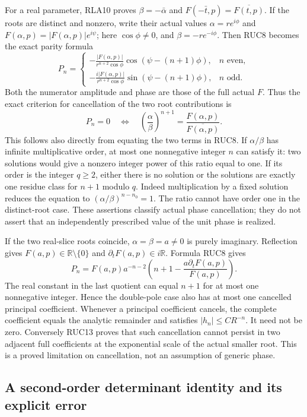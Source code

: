 For a real parameter, RLA10 proves
$\beta=-\bar\alpha$ and $F(-\bar t,p)=\overline{F(t,p)}$.
If the roots are distinct and nonzero, write their actual values
$\alpha=r e^{i\phi}$ and $F(\alpha,p)=|F(\alpha,p)|e^{i\psi}$;
here $\cos\phi\ne0$, and $\beta=-r e^{-i\phi}$.
Then RUC8 becomes the exact parity formula
\[
 P_n=\begin{cases}
 \displaystyle-\frac{|F(\alpha,p)|}{r^{n+2}\cos\phi}
          \cos(\psi-(n+1)\phi),&n\text{ even},\\[5pt]
 \displaystyle-\frac{i|F(\alpha,p)|}{r^{n+2}\cos\phi}
          \sin(\psi-(n+1)\phi),&n\text{ odd}.
 \end{cases}\tag{RUC14}
\]
Both the numerator amplitude and phase are those of the full
actual $F$.  Thus the exact criterion for cancellation of the
two root contributions is
\[
 P_n=0\quad\Longleftrightarrow\quad
 \left(\frac\alpha\beta\right)^{n+1}
       =\frac{F(\alpha,p)}{\overline{F(\alpha,p)}}.
 \tag{RUC15}
\]
This follows also directly from equating the two terms in RUC8.
If $\alpha/\beta$ has infinite multiplicative order, at most one
nonnegative integer $n$ can satisfy it: two solutions would give
a nonzero integer power of this ratio equal to one.  If its order
is the integer $q\ge2$, either there is no solution or the
solutions are exactly one residue class for $n+1$ modulo $q$.
Indeed multiplication by a fixed solution reduces the equation
to $(\alpha/\beta)^{n-n_0}=1$.  The ratio cannot have order one
in the distinct-root case.  These assertions classify actual
phase cancellation; they do not assert that an independently
prescribed value of the unit phase is realized.

If the two real-slice roots coincide, $\alpha=\beta=a\ne0$ is
purely imaginary.  Reflection gives $F(a,p)\in\mathbb R\setminus\{0\}$
and $\partial_tF(a,p)\in i\mathbb R$.  Formula RUC8 gives
\[
 P_n=F(a,p)a^{-n-2}
           \left(n+1-\frac{a\partial_tF(a,p)}{F(a,p)}\right).
 \tag{RUC16}
\]
The real constant in the last quotient can equal $n+1$ for at
most one nonnegative integer.  Hence the double-pole case also
has at most one cancelled principal coefficient.
Whenever a principal coefficient cancels, the complete coefficient
equals the analytic remainder and satisfies $|h_n|\le CR^{-n}$.
It need not be zero.  Conversely RUC13 proves that such
cancellation cannot persist in two adjacent full coefficients
at the exponential scale of the actual smaller root.  This is a
proved limitation on cancellation, not an assumption of generic phase.

\subsection{A second-order determinant identity and its explicit error}

